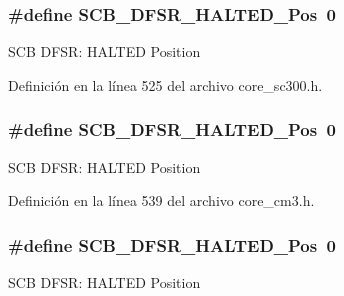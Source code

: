 \subsubsection[{\texorpdfstring{S\+C\+B\+\_\+\+D\+F\+S\+R\+\_\+\+H\+A\+L\+T\+E\+D\+\_\+\+Pos}{SCB_DFSR_HALTED_Pos}}]{\setlength{\rightskip}{0pt plus 5cm}\#define S\+C\+B\+\_\+\+D\+F\+S\+R\+\_\+\+H\+A\+L\+T\+E\+D\+\_\+\+Pos~0}\hypertarget{group___c_m_s_i_s___s_c_b_gaef4ec28427f9f88ac70a13ae4e541378}{}\label{group___c_m_s_i_s___s_c_b_gaef4ec28427f9f88ac70a13ae4e541378}
S\+CB D\+F\+SR\+: H\+A\+L\+T\+ED Position 

Definición en la línea 525 del archivo core\+\_\+sc300.\+h.

\subsubsection[{\texorpdfstring{S\+C\+B\+\_\+\+D\+F\+S\+R\+\_\+\+H\+A\+L\+T\+E\+D\+\_\+\+Pos}{SCB_DFSR_HALTED_Pos}}]{\setlength{\rightskip}{0pt plus 5cm}\#define S\+C\+B\+\_\+\+D\+F\+S\+R\+\_\+\+H\+A\+L\+T\+E\+D\+\_\+\+Pos~0}\hypertarget{group___c_m_s_i_s___s_c_b_gaef4ec28427f9f88ac70a13ae4e541378}{}\label{group___c_m_s_i_s___s_c_b_gaef4ec28427f9f88ac70a13ae4e541378}
S\+CB D\+F\+SR\+: H\+A\+L\+T\+ED Position 

Definición en la línea 539 del archivo core\+\_\+cm3.\+h.

\subsubsection[{\texorpdfstring{S\+C\+B\+\_\+\+D\+F\+S\+R\+\_\+\+H\+A\+L\+T\+E\+D\+\_\+\+Pos}{SCB_DFSR_HALTED_Pos}}]{\setlength{\rightskip}{0pt plus 5cm}\#define S\+C\+B\+\_\+\+D\+F\+S\+R\+\_\+\+H\+A\+L\+T\+E\+D\+\_\+\+Pos~0}\hypertarget{group___c_m_s_i_s___s_c_b_gaef4ec28427f9f88ac70a13ae4e541378}{}\label{group___c_m_s_i_s___s_c_b_gaef4ec28427f9f88ac70a13ae4e541378}
S\+CB D\+F\+SR\+: H\+A\+L\+T\+ED Position 

